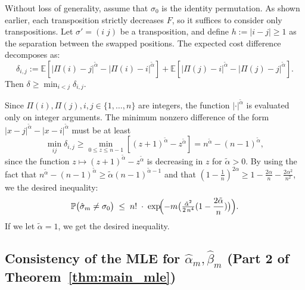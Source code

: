 \documentclass{article}
\renewcommand{\P}{\mathbb{P}}
\begin{document}
Without loss of generality, assume that $\sigma_0$ is the identity permutation. As shown earlier, each transposition strictly decreases $F$, so it suffices to consider only transpositions. Let $\sigma' = (i\;j)$ be a transposition, and define $h := |i - j| \ge 1$ as the separation between the swapped positions. The expected cost difference decomposes as:
\[
\delta_{i,j} := \mathbb{E}\left[ |\Pi(i) - j|^{\tilde\alpha} - |\Pi(i) - i|^{\tilde\alpha} \right]
+ \mathbb{E}\left[ |\Pi(j) - i|^{\tilde\alpha} - |\Pi(j) - j|^{\tilde\alpha} \right].
\]
Then $\delta \ge \min_{i < j} \delta_{i,j}$.

Since $\Pi(i), \Pi(j), i, j \in \{1,\dots,n\}$ are integers, the function $|\cdot|^{\tilde\alpha}$ is evaluated only on integer arguments. The minimum nonzero difference of the form $|x - j|^{\tilde\alpha} - |x - i|^{\tilde\alpha}$ must be at least
\[
\min_{ij}\delta_{i,j}\geq\min_{0 \le z \le n-1} \left[(z+1)^{\tilde\alpha} - z^{\tilde\alpha} \right] = n^{\tilde\alpha} - (n-1)^{\tilde\alpha},
\]
since the function $z \mapsto (z+1)^{\tilde\alpha} - z^{\tilde\alpha}$ is decreasing in $z$ for $\tilde\alpha > 0$.
By using the fact that $n^{\tilde\alpha} - (n-1)^{\tilde\alpha}\geq \tilde\alpha(n-1)^{\tilde\alpha-1}$ and that $(1-\frac{1}{n})^{2\alpha}\geq 1-\frac{2\alpha}{n}-\frac{2\alpha^2}{n^2}$, we the desired inequality:
\[
\P\bigl(\hat\sigma_m\neq\sigma_0\bigr)
\;\le\;
n!\;\cdot\;\exp\!\Bigl(-m\big(\tfrac{\tilde\alpha^2}{2\,n^{4}}(1-\frac{2\tilde\alpha}{n})\big)\Bigr).
\]
If we let $\tilde\alpha=1$, we get the desired inequality. 


\subsection{Consistency of the MLE for \(\hat\alpha_m,\hat\beta_m\) (Part 2 of Theorem~\ref{thm:main_mle})}
\end{document}
